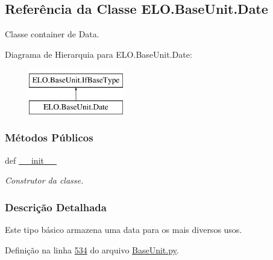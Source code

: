 \hypertarget{classELO_1_1BaseUnit_1_1Date}{\subsection{Referência da Classe E\-L\-O.\-Base\-Unit.\-Date}
\label{classELO_1_1BaseUnit_1_1Date}
}


Classe container de Data.  


Diagrama de Hierarquia para E\-L\-O.\-Base\-Unit.\-Date\-:\begin{figure}[H]
\begin{center}
\leavevmode
\includegraphics[height=2.000000cm]{d2/d74/classELO_1_1BaseUnit_1_1Date}
\end{center}
\end{figure}
\subsubsection*{Métodos Públicos}
\begin{DoxyCompactItemize}
\item 
def \hyperlink{classELO_1_1BaseUnit_1_1Date_a97d924fa5f1b2a1d8afbdbfe17b6a852}{\-\_\-\-\_\-init\-\_\-\-\_\-}
\begin{DoxyCompactList}\small\item\em Construtor da classe. \end{DoxyCompactList}\end{DoxyCompactItemize}


\subsubsection{Descrição Detalhada}
Este tipo básico armazena uma data para os mais diversos usos. 

Definição na linha \hyperlink{BaseUnit_8py_source_l00534}{534} do arquivo \hyperlink{BaseUnit_8py_source}{Base\-Unit.\-py}.



